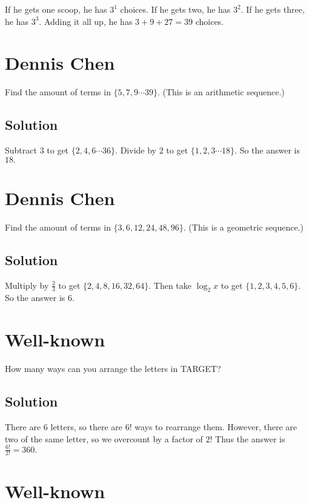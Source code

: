 \documentclass{article}
\begin{document}
If he gets one scoop, he has $3^1$ choices. If he gets two, he has $3^2.$ If he gets three, he has $3^3.$ Adding it all up, he has $3+9+27=39$ choices.

\pagebreak\section{Dennis Chen}

Find the amount of terms in $\{5,7,9\cdots 39\}.$ (This is an arithmetic sequence.)

\subsection{Solution}

Subtract $3$ to get $\{2,4,6\cdots 36\}.$ Divide by $2$ to get $\{1,2,3\cdots 18\}.$ So the answer is $18.$

\pagebreak\section{Dennis Chen}

Find the amount of terms in $\{3,6,12,24,48,96\}.$ (This is a geometric sequence.)

\subsection{Solution}

Multiply by $\frac{2}{3}$ to get $\{2,4,8,16,32,64\}.$ Then take $\log_2{x}$ to get $\{1,2,3,4,5,6\}.$ So the answer is $6.$

\pagebreak\section{Well-known}

How many ways can you arrange the letters in TARGET?

\subsection{Solution}

There are $6$ letters, so there are $6!$ ways to rearrange them. However, there are two of the same letter, so we overcount by a factor of $2!$ Thus the answer is $\frac{6!}{2!}=360.$

\pagebreak\section{Well-known}
\end{document}
